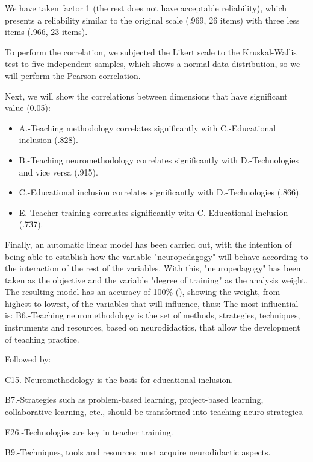 \documentclass[english]{textolivre}
\begin{document}
We have taken factor 1 (the rest does not have acceptable reliability), which presents a reliability similar to the original scale (.969, 26 items) with three less items (.966, 23 items). 

To perform the correlation, we subjected the Likert scale to the Kruskal-Wallis test to five independent samples, which shows a normal data distribution, so we will perform the Pearson correlation.

Next, we will show the correlations between dimensions that have significant value (0.05):

\begin{itemize}
    \item A.-Teaching methodology correlates significantly with C.-Educational inclusion (.828).
    \item B.-Teaching neuromethodology correlates significantly with D.-Technologies and vice versa (.915).
    \item C.-Educational inclusion correlates significantly with D.-Technologies (.866).
    \item E.-Teacher training correlates significantly with C.-Educational inclusion (.737).
\end{itemize}

Finally, an automatic linear model has been carried out, with the intention of being able to establish how the variable "neuropedagogy" will behave according to the interaction of the rest of the variables. With this, "neuropedagogy" has been taken as the objective and the variable "degree of training" as the analysis weight. The resulting model has an accuracy of 100\% (), showing the weight, from highest to lowest, of the variables that will influence, thus:
The most influential is: B6.-Teaching neuromethodology is the set of methods, strategies, techniques, instruments and resources, based on neurodidactics, that allow the development of teaching practice.

Followed by:

C15.-Neuromethodology is the basis for educational inclusion.

B7.-Strategies such as problem-based learning, project-based learning, collaborative learning, etc., should be transformed into teaching neuro-strategies.

E26.-Technologies are key in teacher training.

B9.-Techniques, tools and resources must acquire neurodidactic aspects.
\end{document}
